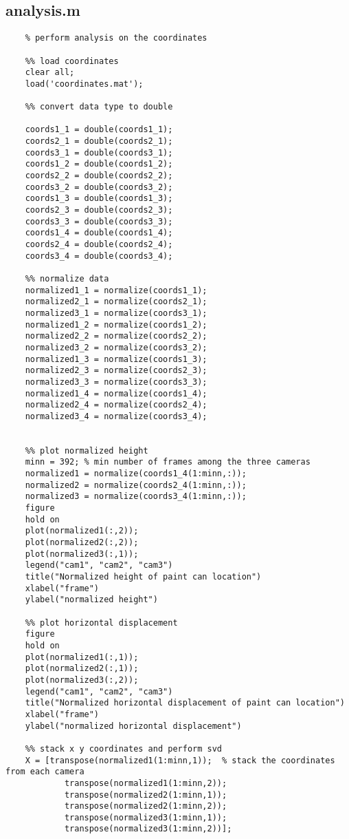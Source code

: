\documentclass[12pt, a4paper]{article}
\begin{document}
\subsection{analysis.m}
\begin{verbatim}
    % perform analysis on the coordinates

    %% load coordinates
    clear all;
    load('coordinates.mat');
    
    %% convert data type to double
    
    coords1_1 = double(coords1_1);
    coords2_1 = double(coords2_1);
    coords3_1 = double(coords3_1);
    coords1_2 = double(coords1_2);
    coords2_2 = double(coords2_2);
    coords3_2 = double(coords3_2);
    coords1_3 = double(coords1_3);
    coords2_3 = double(coords2_3);
    coords3_3 = double(coords3_3);
    coords1_4 = double(coords1_4);
    coords2_4 = double(coords2_4);
    coords3_4 = double(coords3_4);
    
    %% normalize data
    normalized1_1 = normalize(coords1_1);
    normalized2_1 = normalize(coords2_1);
    normalized3_1 = normalize(coords3_1);
    normalized1_2 = normalize(coords1_2);
    normalized2_2 = normalize(coords2_2);
    normalized3_2 = normalize(coords3_2);
    normalized1_3 = normalize(coords1_3);
    normalized2_3 = normalize(coords2_3);
    normalized3_3 = normalize(coords3_3);
    normalized1_4 = normalize(coords1_4);
    normalized2_4 = normalize(coords2_4);
    normalized3_4 = normalize(coords3_4);
    
    
    %% plot normalized height
    minn = 392; % min number of frames among the three cameras
    normalized1 = normalize(coords1_4(1:minn,:));
    normalized2 = normalize(coords2_4(1:minn,:));
    normalized3 = normalize(coords3_4(1:minn,:));
    figure
    hold on
    plot(normalized1(:,2));
    plot(normalized2(:,2));
    plot(normalized3(:,1));
    legend("cam1", "cam2", "cam3")
    title("Normalized height of paint can location")
    xlabel("frame")
    ylabel("normalized height")
    
    %% plot horizontal displacement
    figure
    hold on
    plot(normalized1(:,1));
    plot(normalized2(:,1));
    plot(normalized3(:,2));
    legend("cam1", "cam2", "cam3")
    title("Normalized horizontal displacement of paint can location")
    xlabel("frame")
    ylabel("normalized horizontal displacement")
    
    %% stack x y coordinates and perform svd
    X = [transpose(normalized1(1:minn,1));  % stack the coordinates from each camera
            transpose(normalized1(1:minn,2));
            transpose(normalized2(1:minn,1));
            transpose(normalized2(1:minn,2));
            transpose(normalized3(1:minn,1));
            transpose(normalized3(1:minn,2))];
        

\end{verbatim}
\end{document}
